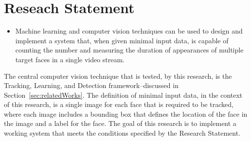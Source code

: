 \section{Reseach Statement}
  \begin{itemize}
    \item
    Machine learning and computer vision techniques can be used to design and implement a system that, when given minimal input data, is capable of counting the number and measuring the duration of appearances of multiple target faces in a single video stream.
  \end{itemize}

  The central computer vision technique that is tested, by this research, is the Tracking, Learning, and Detection framework--discussed in Section~\ref{sec:relatedWorks}.
  The definition of minimal input data, in the context of this research, is a single image for each face that is required to be tracked, where each image includes a bounding box that defines the location of the face in the image and a label for the face.
  The goal of this research is to implement a working system that meets the conditions specified by the Research Statement.
